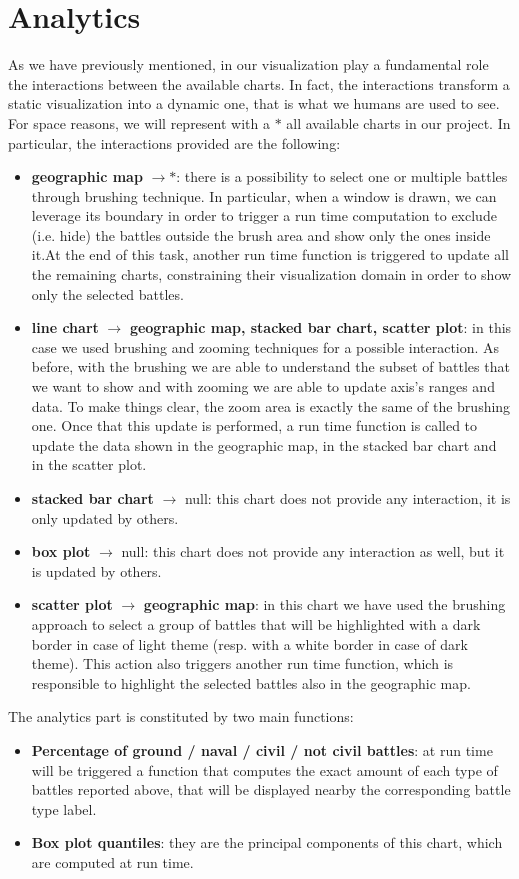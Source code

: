 \section{Analytics}
As we have previously mentioned, in our visualization play a fundamental role the interactions between the available charts.
In fact, the interactions transform a static visualization into a dynamic one, that is what we humans are used to see.
For space reasons, we will represent with a $*$ all available charts in our project.
In particular, the interactions provided are the following:
\begin{itemize}
    \item \textbf{geographic map} $\rightarrow *$: there is a possibility to select one or multiple battles through brushing technique. In particular, when a window is drawn, we can leverage its boundary in order to trigger a run time computation to exclude (i.e. hide) the battles outside the brush area and show only the ones inside it.At the end of this task, another run time function is triggered to update all the remaining charts, constraining their visualization domain in order to show only the selected battles.
    \item \textbf{line chart} $\rightarrow$ \textbf{geographic map, stacked bar chart, scatter plot}: in this case we used brushing and zooming techniques for a possible interaction. As before, with the brushing we are able to understand the subset of battles that we want to show and with zooming we are able to update axis's ranges and data. To make things clear, the zoom area is exactly the same of the brushing one. Once that this update is performed, a run time function is called to update the data shown in the geographic map, in the stacked bar chart and in the scatter plot.
    \item \textbf{stacked bar chart} $\rightarrow$ null: this chart does not provide any interaction, it is only updated by others.
    \item \textbf{box plot} $\rightarrow$ null: this chart does not provide any interaction as well, but it is updated by others.
    \item \textbf{scatter plot} $\rightarrow$ \textbf{geographic map}: in this chart we have used the brushing approach to select a group of battles that will be highlighted with a dark border in case of light theme (resp. with a white border in case of dark theme). This action also triggers another run time function, which is responsible to highlight the selected battles also in the geographic map.
\end{itemize}

The analytics part is constituted by two main functions:
\begin{itemize}
    \item \textbf{Percentage of ground / naval / civil / not civil battles}: at run time will be triggered a function that computes the exact amount of each type of battles reported above, that will be displayed nearby the corresponding battle type label.
    \item \textbf{Box plot quantiles}: they are the principal components of this chart, which are computed at run time.
\end{itemize}
